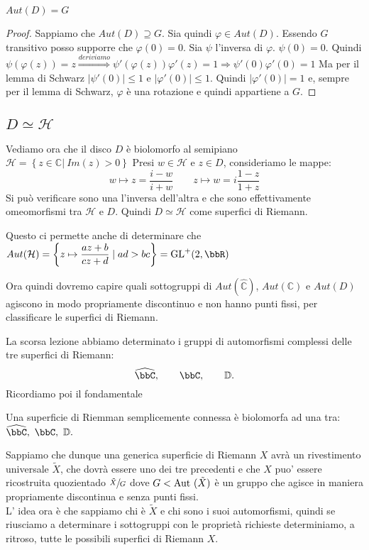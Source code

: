 \begin{proposizione}
$Aut(D)=G$
\end{proposizione}
\begin{proof}
Sappiamo che $Aut(D) \supseteq G$. Sia quindi $\varphi \in Aut(D)$. Essendo $G$ transitivo posso supporre che $\varphi(0)=0$.
Sia $\psi$ l'inversa di $\varphi$. $\psi (0)=0$. Quindi
$\psi (\varphi (z))=z \stackrel{deriviamo}{\Longrightarrow} \psi ' (\varphi (z)) \varphi '(z) =1 \Rightarrow \psi'(0) \varphi'(0) =1$
Ma per il lemma di Schwarz $|\psi'(0)| \leq 1$ e $|\varphi'(0)| \leq 1$. Quindi $|\varphi'(0)|=1$ e, sempre per il lemma di Schwarz,
$\varphi$ è una rotazione e quindi appartiene a $G$.
\end{proof}

\subsection {$D \simeq \mathcal{H}$}

Vediamo ora che il disco $D$ è biolomorfo al semipiano $\mathcal{H} = \left \{ z \in \mathbb{C} | \ Im (z)>0 \right \}$
Presi $w \in \mathcal{H}$ e $z \in D$, consideriamo le mappe:
$$w \mapsto z=\frac{i-w}{i+w} \qquad z \mapsto w= i\frac{1-z}{1+z}$$
Si può verificare sono una l'inversa dell'altra e che sono effettivamente omeomorfismi tra $\mathcal{H}$ e $D$.
Quindi $D \simeq \mathcal{H}$ come superfici di Riemann.

Questo ci permette anche di determinare che $Aut( \mathcal{H}) = \left \{ z \mapsto \displaystyle{\frac{az+b}{cz+d}} \mid ad > bc \right \} = \GL^+ (2, \bbR)$

Ora quindi dovremo capire quali sottogruppi di $Aut (\hat{\mathbb{C}})$, $Aut(\mathbb{C})$ e $Aut(D)$ agiscono in modo propriamente discontinuo
e non hanno punti fissi, per classificare le superfici di Riemann.



La scorsa lezione abbiamo determinato i gruppi di automorfismi complessi delle tre superfici di Riemann:
$$
\hat{\bbC},\qquad \bbC, \qquad \mathbb{D}.
$$
Ricordiamo poi il fondamentale
\begin{teorema}[Riemann] Una superficie di Riemman semplicemente connessa è biolomorfa ad una tra:
$\hat{\bbC},\ \bbC, \ \mathbb{D}. $
\end{teorema}
Sappiamo che dunque una generica superficie di Riemann $X$ avrà un rivestimento universale $\tilde{X}$, che dovrà essere uno dei tre precedenti e che $X$ puo' essere ricostruita quozientado $\sfrac{\tilde{X}}{G}$ dove $G<\text{Aut }(\tilde{X})$ è un gruppo che agisce in maniera propriamente discontinua e senza punti fissi.\\
L' idea ora è che sappiamo chi è $\tilde{X}$ e chi sono i suoi automorfismi, quindi se riusciamo a determinare i sottogruppi con le proprietà richieste determiniamo, a ritroso, tutte le possibili superfici di Riemann $X$.\\

